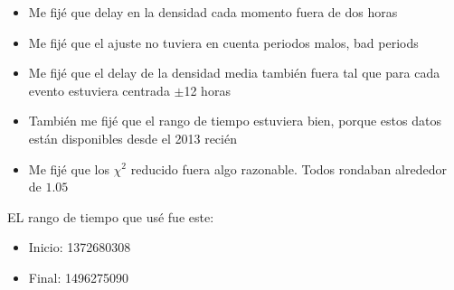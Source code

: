 			\begin{itemize}
				\item Me fijé que delay en la densidad cada momento fuera de dos  horas
				\item Me fijé que el ajuste no tuviera en cuenta periodos malos, bad periods
				\item Me fijé que el delay de la densidad media también fuera tal que para cada evento estuviera centrada $\pm$12 horas
				\item También me fijé que el rango de tiempo estuviera bien, porque estos datos están disponibles desde el 2013  recién
				\item Me fijé que los $\chi^2$ reducido fuera algo razonable. Todos rondaban alrededor de $1.05$
			\end{itemize}

			EL rango de tiempo que usé fue este: 
			\begin{itemize}
				\item Inicio: 1372680308
				\item Final: 1496275090
			\end{itemize}
